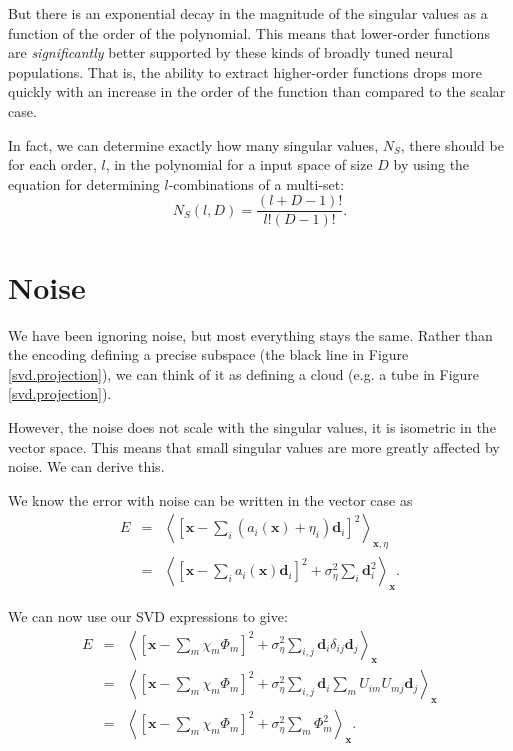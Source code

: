 \documentclass[10pt,letterpaper,oneside]{article}
\begin{document}
But there is an exponential decay in the magnitude of the singular
values as a function of the order of the polynomial. This means that
lower-order functions are \emph{significantly} better supported by
these kinds of broadly tuned neural populations. That is, the ability
to extract higher-order functions drops more quickly with an increase
in the order of the function than compared to the scalar case.

In fact, we can determine exactly how many singular values, $N_{S}$,
there should be for each order, $l$, in the polynomial for a input
space of size $D$ by using the equation for determining $l$-combinations
of a multi-set:
\begin{equation}
N_{S}(l,D)=\frac{(l+D-1)!}{l!(D-1)!}.\label{c5.eq.combinations}
\end{equation}

\section{Noise}

We have been ignoring noise, but most everything stays the same. Rather
than the encoding defining a precise subspace (the black line in Figure \ref{svd.projection}), we can think of it as defining a cloud (e.g. a
tube in Figure \ref{svd.projection}).

However, the noise does not scale with the singular values, it is isometric
in the vector space. This means that small singular values are more
greatly affected by noise. We can derive this.

We know the error with noise can be written in the vector case as
\begin{eqnarray}
E & = & \left\langle \left[\mathbf{x}-\sum_{i}\left(a_{i}(\mathbf{x})+\eta_{i}\right)\mathbf{d}_{i}\right]^{2}\right\rangle _{\mathbf{x},\eta}\nonumber \\
 & = & \left\langle \left[\mathbf{x}-\sum_{i}a_{i}(\mathbf{x})\mathbf{d}_{i}\right]^{2}+\sigma_{\eta}^{2}\sum_{i}\mathbf{d}_{i}^{2}\right\rangle _{\mathbf{x}}.\label{AH.eq.error}
\end{eqnarray}

We can now use our SVD expressions to give:
\begin{eqnarray}
E & = & \left\langle \left[\mathbf{x}-\sum_{m}\chi_{m}\Phi_{m}\right]^{2}+\sigma_{\eta}^{2}\sum_{i,j}\mathbf{d}_{i}\delta_{ij}\mathbf{d}_{j}\right\rangle _{\mathbf{x}}\nonumber \\
 & = & \left\langle \left[\mathbf{x}-\sum_{m}\chi_{m}\Phi_{m}\right]^{2}+\sigma_{\eta}^{2}\sum_{i,j}\mathbf{d}_{i}\sum_{m}U_{im}U_{mj}\mathbf{d}_{j}\right\rangle _{\mathbf{x}}\nonumber \\
 & = & \left\langle \left[\mathbf{x}-\sum_{m}\chi_{m}\Phi_{m}\right]^{2}+\sigma_{\eta}^{2}\sum_{m}\Phi_{m}^{2}\right\rangle _{\mathbf{x}}.\label{AH.eq.error.final}
\end{eqnarray}
\end{document}
